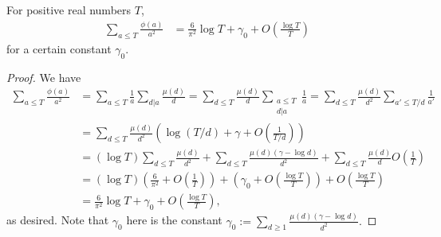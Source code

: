 \documentclass[10pt,a4paper]{amsart}
\newcommand{\lrp}[1]{\left(#1\right)}
\begin{document}
\begin{lemma} \label{lem:sum-phi-over-a2}
    For positive real numbers $T$,
    \begin{align}
        \sum_{a \le T} \frac{\phi(a)}{a^2} &= \frac{6}{\pi^2} \log T + \gamma_0 + O\lrp{\frac{\log T}{T}} 
    \end{align}
    for a certain constant $\gamma_0$.
\end{lemma}

\begin{proof}
    We have 
    \begin{align}
        \sum_{a \le T} \frac{\phi(a)}{a^2} &= \sum_{a \le T} \frac{1}{a} \sum_{d|a} \frac{\mu(d)}{d} = \sum_{d \le T} \frac{\mu(d)}{d} \sum_{\substack{a \le T \\ d|a}} \frac{1}{a} = \sum_{d \le T} \frac{\mu(d)}{d^2} \sum_{a' \le T/d } \frac{1}{a'}  \\
        &= \sum_{d \le T} \frac{\mu(d)}{d^2} \lrp{\log (T/d) + \gamma + O\lrp{\frac{1}{T/d}} }
        \\
        &= (\log T) \sum_{d \le T} \frac{\mu(d)}{d^2} + \sum_{d \le T} \frac{\mu(d)(\gamma-\log d)}{d^2} + \sum_{d \le T} \frac{\mu(d)}{d} O\lrp{\frac1T}
        \\
        &= (\log T)\lrp{\frac{6}{\pi^2} + O\lrp{\frac1T}} + \lrp{\gamma_0 + O\lrp{\frac{\log T}{T}}} + O\lrp{\frac{\log T}{T}} \\
        &= \frac{6}{\pi^2} \log T + \gamma_0 + O\lrp{\frac{\log T}{T}},
    \end{align}
    as desired.
    Note that $\gamma_0$ here is the constant
    $\displaystyle
        \gamma_0 := \sum_{d \ge 1} \frac{\mu(d)(\gamma-\log d)}{d^2}.
    $
\end{proof}
\end{document}
